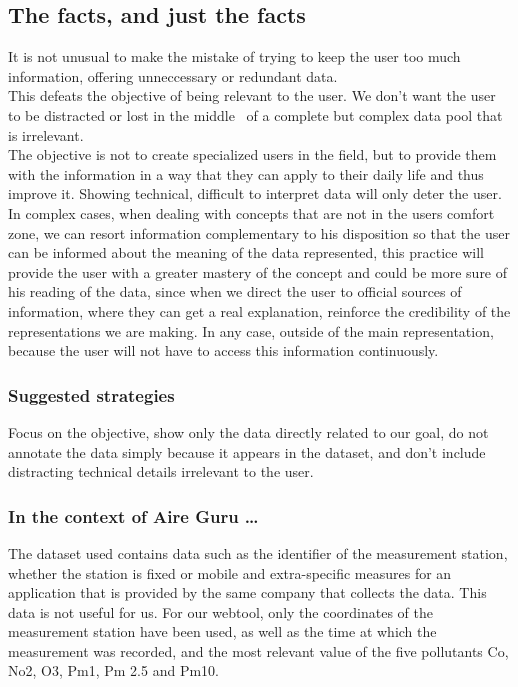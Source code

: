 \subsection{The facts, and just the facts}

It is not unusual to make the mistake of trying to keep the user too much information, offering unneccessary or redundant data.\\
 
This defeats the objective of being relevant to the user. We don't want the user to be distracted or lost in the middle
 of a complete but complex data pool that is irrelevant.\\

The objective is not to create specialized users in the field, but to provide them with the
information in a way that they can apply to their daily life and thus improve it. Showing
technical, difficult to interpret data will only deter the user. \\

In complex cases, when dealing with concepts that are not in the users comfort zone, we can resort information
complementary to his disposition so that the user can be informed about the meaning of the data
represented, this practice will provide the user with a greater mastery of the concept and could be more
sure of his reading of the data, since when we direct the user to official sources of information, where they can
get a real explanation, reinforce the credibility of the representations we are making. In any case,
outside of the main representation, because the user will not have to access this information continuously.\\

\subsubsection*{Suggested strategies}

Focus on the objective, show only the data directly related to our goal, do not annotate the data
simply because it appears in the dataset, and don't include distracting technical details irrelevant to the user.

\subsubsection*{In the context of Aire Guru \ldots} 

The dataset used contains data such as the identifier of the measurement station, whether the station is fixed or mobile
and extra-specific measures for an application that is provided by the same company that collects the data. This data is not useful for us.
For our webtool, only the coordinates of the measurement station have been used, as well as the time at which the measurement was recorded, and the most relevant value of the five pollutants Co, No2, O3, Pm1, Pm 2.5 and Pm10.\\

